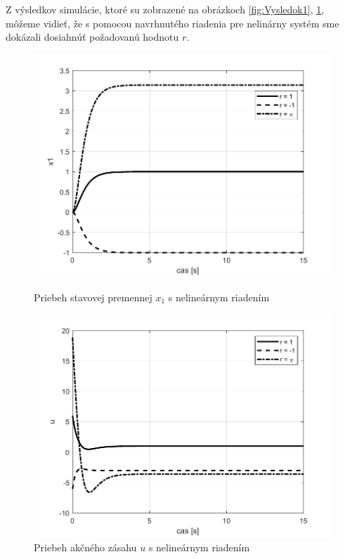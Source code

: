 \documentclass[../main.tex]{subfiles}
\begin{document}
Z výsledkov simulácie, ktoré su zobrazené na obrázkoch \ref{fig:Vysledok1}, \ref{fig:Vysledok2}, môžeme vidieť, že s pomocou navrhnutého riadenia pre nelinárny systém sme dokázali dosiahnúť požadovanú hodnotu $r$.
\begin{figure}[!htb]
   \begin{minipage}{0.46\textwidth}
     \centering
     \includegraphics[width=1\linewidth]{x.pdf}
     \caption{Priebeh stavovej premennej $x_1$ s nelineárnym riadením}
	\label{fig:Vysledok1}
   \end{minipage}\hfill
   \begin{minipage}{0.46\textwidth}
     \centering
     \includegraphics[width=1\linewidth]{u.pdf}
     \caption{Priebeh akčného zásahu $u$ s nelineárnym riadením}
	\label{fig:Vysledok2}
   \end{minipage}
\end{figure}
\end{document}
